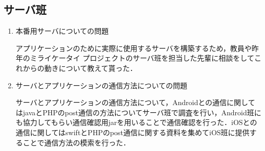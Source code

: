 \subsection{サーバ班}
\begin{enumerate}
\item 本番用サーバについての問題
\par
アプリケーションのために実際に使用するサーバを構築するため，教員や昨年のミライケータイ
プロジェクトのサーバ班を担当した先輩に相談をしてこれからの動きについて教えて貰った．
\item サーバとアプリケーションの通信方法についての問題
\par
サーバとアプリケーションの通信方法について，Androidとの通信に関してはjavaとPHPのpost通信の方法についてサーバ班で調査を行い，Android班にも協力してもらい通信確認用jarを用いることで通信確認を行った．iOSとの通信に関してはswiftとPHPのpost通信に関する資料を集めてiOS班に提供することで通信方法の模索を行った．
\end{enumerate}
